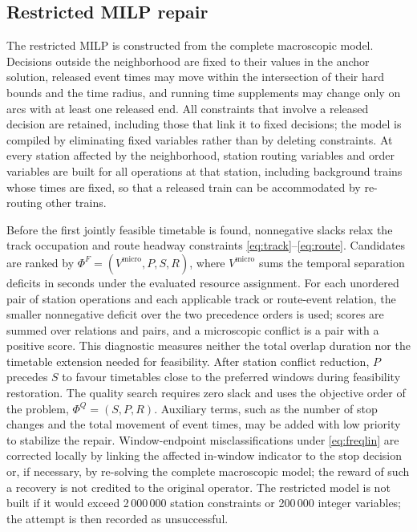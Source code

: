 \subsection{Restricted MILP repair}\label{sec:repair}
The restricted MILP is constructed from the complete macroscopic model. Decisions outside the neighborhood are fixed to their values in the anchor solution, released event times may move within the intersection of their hard bounds and the time radius, and running time supplements may change only on arcs with at least one released end. All constraints that involve a released decision are retained, including those that link it to fixed decisions; the model is compiled by eliminating fixed variables rather than by deleting constraints. At every station affected by the neighborhood, station routing variables and order variables are built for all operations at that station, including background trains whose times are fixed, so that a released train can be accommodated by re-routing other trains.

Before the first jointly feasible timetable is found, nonnegative slacks relax the track occupation and route headway constraints \eqref{eq:track}--\eqref{eq:route}. Candidates are ranked by $\Phi^F=(V^{\mathrm{micro}},P,S,R)$, where $V^{\mathrm{micro}}$ sums the temporal separation deficits in seconds under the evaluated resource assignment. For each unordered pair of station operations and each applicable track or route-event relation, the smaller nonnegative deficit over the two precedence orders is used; scores are summed over relations and pairs, and a microscopic conflict is a pair with a positive score. This diagnostic measures neither the total overlap duration nor the timetable extension needed for feasibility. After station conflict reduction, $P$ precedes $S$ to favour timetables close to the preferred windows during feasibility restoration. The quality search requires zero slack and uses the objective order of the problem, $\Phi^Q=(S,P,R)$. Auxiliary terms, such as the number of stop changes and the total movement of event times, may be added with low priority to stabilize the repair. Window-endpoint misclassifications under \eqref{eq:freqlin} are corrected locally by linking the affected in-window indicator to the stop decision or, if necessary, by re-solving the complete macroscopic model; the reward of such a recovery is not credited to the original operator. The restricted model is not built if it would exceed 2\,000\,000 station constraints or 200\,000 integer variables; the attempt is then recorded as unsuccessful.

